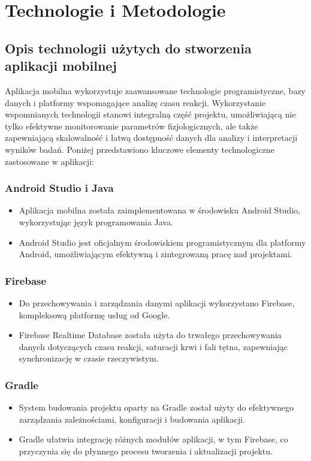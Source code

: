 \chapter{Technologie i Metodologie}
\section{Opis technologii użytych do stworzenia aplikacji mobilnej}
Aplikacja mobilna wykorzystuje zaawansowane technologie programistyczne, bazy danych i platformy wspomagające analizę czasu reakcji. Wykorzystanie wspomnianych technologii stanowi integralną część projektu, umożliwiającą nie tylko efektywne monitorowanie parametrów fizjologicznych, ale także zapewniającą skalowalność i łatwą dostępność danych dla analizy i interpretacji wyników badań. Poniżej przedstawiono kluczowe elementy technologiczne zastosowane w aplikacji:
\subsection{Android Studio i Java}
\begin{itemize}
    \item Aplikacja mobilna została zaimplementowana w środowisku Android Studio, wykorzystując język programowania Java.
    \item Android Studio jest oficjalnym środowiskiem programistycznym dla platformy Android, umożliwiającym efektywną i zintegrowaną pracę nad projektami.
\end{itemize}
\subsection{Firebase}
\begin{itemize}
    \item Do przechowywania i zarządzania danymi aplikacji wykorzystano Firebase, kompleksową platformę usług od Google.
    \item Firebase Realtime Database została użyta do trwałego przechowywania danych dotyczących czasu reakcji, saturacji krwi i fali tętna, zapewniając synchronizację w czasie rzeczywistym.
\end{itemize}
\subsection{Gradle}
\begin{itemize}
    \item System budowania projektu oparty na Gradle został użyty do efektywnego zarządzania zależnościami, konfiguracji i budowania aplikacji.
    \item Gradle ułatwia integrację różnych modułów aplikacji, w tym Firebase, co przyczynia się do płynnego procesu tworzenia i aktualizacji projektu.
\end{itemize}
